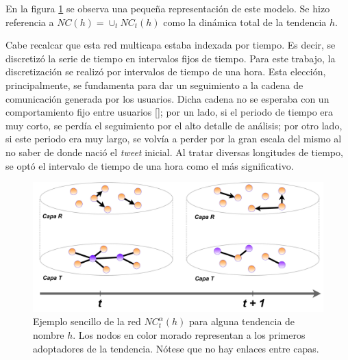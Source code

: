 \documentclass[../main.tex]{subfiles}
\begin{document}
En la figura \ref{fig:rep_network_model} se observa una pequeña representación de este modelo. Se hizo referencia a $NC(h) = \cup_{t} NC_{t}(h)$ como la dinámica total de la tendencia $h$. 




Cabe recalcar que esta red multicapa estaba indexada por tiempo. Es decir, se discretizó la serie de tiempo en intervalos fijos de tiempo. Para este trabajo, la discretización se realizó por intervalos de tiempo de una hora. Esta elección, principalmente, se fundamenta para dar un seguimiento a la cadena de comunicación generada por los usuarios. Dicha cadena no se esperaba con un comportamiento fijo entre usuarios [\cite{Miritello2013}]; por un lado, si el periodo de tiempo era muy corto, se perdía el seguimiento por el alto detalle de análisis; por otro lado, si este periodo era muy largo, se volvía a perder por la gran escala del mismo al no saber de donde nació el \textit{tweet} inicial. Al tratar diversas longitudes de tiempo, se optó el intervalo de tiempo de una hora como el más significativo.








\begin{figure}
    \centering
    \includegraphics[scale = 0.27]{images/metodologia_multiplexnetwork.drawio.pdf}
    \caption{Ejemplo sencillo de la red $NC^{\alpha}_{t} (h)$ para alguna tendencia de nombre $h$.  Los nodos en color morado representan a los primeros adoptadores de la tendencia. Nótese que no hay enlaces entre capas.}
    \label{fig:rep_network_model}
\end{figure}



\end{document}
